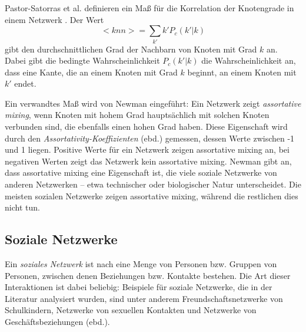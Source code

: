 Pastor-Satorras et al. definieren ein Ma{\ss} für die Korrelation der
Knotengrade in einem Netzwerk \cite{PhysRevLett.87.258701}. Der Wert
\begin{equation}
  \label{eq:9}
  <knn> = \sum_{k'} k'P_c (k'|k)
\end{equation}
gibt den durchschnittlichen Grad der Nachbarn von Knoten mit Grad $k$
an.  Dabei gibt die bedingte Wahrscheinlichkeit $P_c(k'|k)$ die
Wahrscheinlichkeit an, dass eine Kante, die an einem Knoten mit Grad
$k$ beginnt, an einem Knoten mit $k'$ endet.

Ein verwandtes Ma{\ss} wird von Newman eingeführt: Ein Netzwerk zeigt
\emph{assortative mixing}, wenn Knoten mit hohem Grad hauptsächlich
mit solchen Knoten verbunden sind, die ebenfalls einen hohen Grad
haben\cite{PhysRevLett.89.208701}. Diese Eigenschaft wird durch den
\emph{Assortativity-Koeffizienten} (ebd.)  gemessen, dessen Werte
zwischen -1 und 1 liegen. Positive Werte für ein Netzwerk zeigen
assortative mixing an, bei negativen Werten zeigt das Netzwerk kein
assortative mixing. Newman gibt an, dass assortative mixing eine
Eigenschaft ist, die viele soziale Netzwerke von anderen Netzwerken --
etwa technischer oder biologischer Natur unterscheidet. Die
meisten sozialen Netzwerke zeigen assortative mixing, während die
restlichen dies nicht tun.

\subsection{Soziale Netzwerke}
\label{sec:soziale-netzwerke}

Ein \emph{soziales Netzwerk} ist nach \cite{newman:167} eine
Menge von Personen bzw. Gruppen von Personen, zwischen denen
Beziehungen bzw. Kontakte bestehen. Die Art dieser Interaktionen ist
dabei beliebig: Beispiele f\"ur soziale Netzwerke, die in der Literatur analysiert
wurden, sind unter anderem Freundschaftsnetzwerke von Schulkindern, Netzwerke
von sexuellen Kontakten und Netzwerke von Geschäftsbeziehungen
(ebd.).

